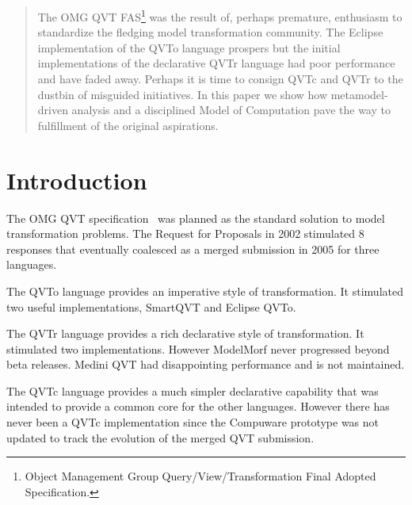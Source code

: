 \documentclass[conference]{IEEEtran}
\begin{document}
\begin{abstract}
The OMG QVT FAS\footnote{Object Management Group Query/View/Transformation Final Adopted Specification.} was the result of, perhaps premature, enthusiasm to standardize the fledging model transformation community. The Eclipse implementation of the QVTo language prospers but the initial implementations of the declarative QVTr language had poor performance and have faded away. Perhaps it is time to consign QVTc and QVTr to the dustbin of misguided initiatives. In this paper we show how metamodel-driven analysis and a disciplined Model of Computation pave the way to fulfillment of the original aspirations.
\end{abstract}





%
\IEEEpeerreviewmaketitle



\section{Introduction}

The OMG QVT specification~\cite{QVT-1.3} was planned as the standard solution to model transformation problems. The Request for Proposals in 2002 stimulated 8 responses that eventually coalesced as a merged submission in 2005 for three languages.

The QVTo language provides an imperative style of transformation. It stimulated two useful implementations, SmartQVT and Eclipse QVTo. %

The QVTr language provides a rich declarative style of transformation. It stimulated two implementations. However ModelMorf never progressed beyond beta releases. 
Medini QVT had disappointing performance and is not maintained.

The QVTc language provides a much simpler declarative capability that was intended to provide a common core for the other languages. However there has never been a QVTc implementation since the Compuware prototype was not updated to track the evolution of the merged QVT submission.
\end{document}
